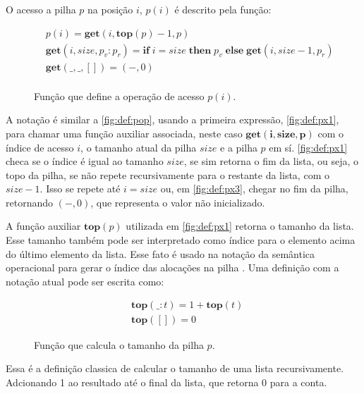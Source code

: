 O acesso a pilha $p$ na posição $i$, $p(i)$ é descrito pela função:

\begin{figure}[h]
	\begin{align}
	&p(i) = \mathbf{get}(i, \mathbf{top}(p) - 1, p) \label{fig:def:px1}\\
	&\mathbf{get}(i, size, p_v : p_r) = \mathbf{if}\;i = size \;\mathbf{then}\;p_v\;\mathbf{else}\;\mathbf{get}(i, size - 1, p_r) \label{fig:def:px2}\\
	&\mathbf{get}(\_, \_, []) = (-,0) \label{fig:def:px3}\\
	\end{align}
	\caption{Função que define a operação de acesso $p(i)$.}
	\label{fig:def:px}
\end{figure}

A notação é similar a \ref{fig:def:pop}, usando a primeira expressão, \ref{fig:def:px1}, para chamar uma função auxiliar associada, neste caso $\mathbf{get(i, size, p)}$ com o índice de acesso $i$, o tamanho atual da pilha $size$ e a pilha $p$ em sí. \ref{fig:def:px1} checa se o índice é igual ao tamanho $size$, se sim retorna o fim da lista, ou seja, o topo da pilha, se não repete recursivamente para o restante da lista, com o $size - 1$. Isso se repete até $i = size$ ou, em \ref{fig:def:px3}, chegar no fim da pilha, retornando $(-,0)$, que representa o valor não inicializado.

A função auxiliar $\mathbf{top}(p)$ utilizada em \ref{fig:def:px1} retorna o tamanho da lista. Esse tamanho também pode ser interpretado como índice para o elemento acima do último elemento da lista. Esse fato é usado na notação da semântica operacional para gerar o índice das alocações na pilha . Uma definição com a notação atual pode ser escrita como:

\begin{figure}[h]
	\begin{align}
	&\mathbf{top}(\_ : t) = 1 + \mathbf{top}(t) \label{fig:def:top1}\\
	&\mathbf{top}([]) = 0 \label{fig:def:top2}
	\end{align}
	\caption{Função que calcula o tamanho da pilha $p$.}
	\label{fig:def:top}
\end{figure}

Essa é a definição classica de calcular o tamanho de uma lista recursivamente. Adcionando 1 ao resultado até o final da lista, que retorna 0 para a conta.





